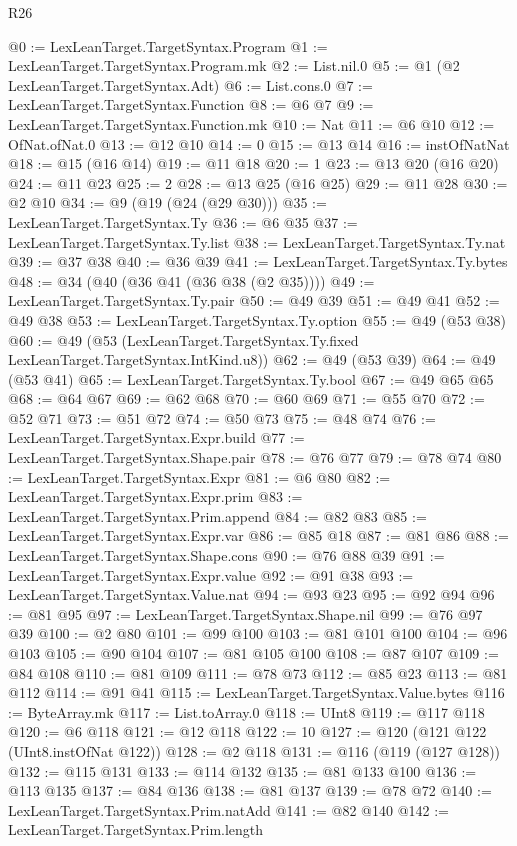 \begin{lexlean}{R26}
\begin{coremodule}
{{{{{@0 := LexLeanTarget.TargetSyntax.Program
@1 := LexLeanTarget.TargetSyntax.Program.mk
@2 := List.nil.{0}
@5 := @1 (@2 LexLeanTarget.TargetSyntax.Adt)
@6 := List.cons.{0}
@7 := LexLeanTarget.TargetSyntax.Function
@8 := @6 @7
@9 := LexLeanTarget.TargetSyntax.Function.mk
@10 := Nat
@11 := @6 @10
@12 := OfNat.ofNat.{0}
@13 := @12 @10
@14 := 0
@15 := @13 @14
@16 := instOfNatNat
@18 := @15 (@16 @14)
@19 := @11 @18
@20 := 1
@23 := @13 @20 (@16 @20)
@24 := @11 @23
@25 := 2
@28 := @13 @25 (@16 @25)
@29 := @11 @28
@30 := @2 @10
@34 := @9 (@19 (@24 (@29 @30)))
@35 := LexLeanTarget.TargetSyntax.Ty
@36 := @6 @35
@37 := LexLeanTarget.TargetSyntax.Ty.list
@38 := LexLeanTarget.TargetSyntax.Ty.nat
@39 := @37 @38
@40 := @36 @39
@41 := LexLeanTarget.TargetSyntax.Ty.bytes
@48 := @34 (@40 (@36 @41 (@36 @38 (@2 @35))))
@49 := LexLeanTarget.TargetSyntax.Ty.pair
@50 := @49 @39
@51 := @49 @41
@52 := @49 @38
@53 := LexLeanTarget.TargetSyntax.Ty.option
@55 := @49 (@53 @38)
@60 := @49 (@53 (LexLeanTarget.TargetSyntax.Ty.fixed LexLeanTarget.TargetSyntax.IntKind.u8))
@62 := @49 (@53 @39)
@64 := @49 (@53 @41)
@65 := LexLeanTarget.TargetSyntax.Ty.bool
@67 := @49 @65 @65
@68 := @64 @67
@69 := @62 @68
@70 := @60 @69
@71 := @55 @70
@72 := @52 @71
@73 := @51 @72
@74 := @50 @73
@75 := @48 @74
@76 := LexLeanTarget.TargetSyntax.Expr.build
@77 := LexLeanTarget.TargetSyntax.Shape.pair
@78 := @76 @77
@79 := @78 @74
@80 := LexLeanTarget.TargetSyntax.Expr
@81 := @6 @80
@82 := LexLeanTarget.TargetSyntax.Expr.prim
@83 := LexLeanTarget.TargetSyntax.Prim.append
@84 := @82 @83
@85 := LexLeanTarget.TargetSyntax.Expr.var
@86 := @85 @18
@87 := @81 @86
@88 := LexLeanTarget.TargetSyntax.Shape.cons
@90 := @76 @88 @39
@91 := LexLeanTarget.TargetSyntax.Expr.value
@92 := @91 @38
@93 := LexLeanTarget.TargetSyntax.Value.nat
@94 := @93 @23
@95 := @92 @94
@96 := @81 @95
@97 := LexLeanTarget.TargetSyntax.Shape.nil
@99 := @76 @97 @39
@100 := @2 @80
@101 := @99 @100
@103 := @81 @101 @100
@104 := @96 @103
@105 := @90 @104
@107 := @81 @105 @100
@108 := @87 @107
@109 := @84 @108
@110 := @81 @109
@111 := @78 @73
@112 := @85 @23
@113 := @81 @112
@114 := @91 @41
@115 := LexLeanTarget.TargetSyntax.Value.bytes
@116 := ByteArray.mk
@117 := List.toArray.{0}
@118 := UInt8
@119 := @117 @118
@120 := @6 @118
@121 := @12 @118
@122 := 10
@127 := @120 (@121 @122 (UInt8.instOfNat @122))
@128 := @2 @118
@131 := @116 (@119 (@127 @128))
@132 := @115 @131
@133 := @114 @132
@135 := @81 @133 @100
@136 := @113 @135
@137 := @84 @136
@138 := @81 @137
@139 := @78 @72
@140 := LexLeanTarget.TargetSyntax.Prim.natAdd
@141 := @82 @140
@142 := LexLeanTarget.TargetSyntax.Prim.length
}}}}}
\end{coremodule}
\end{lexlean}
